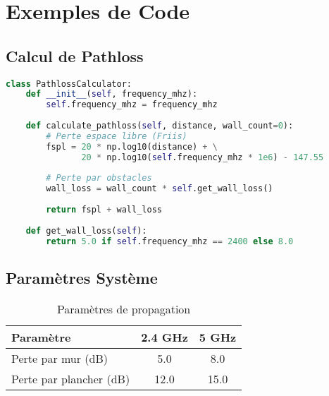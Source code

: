 \documentclass[12pt,a4paper]{article}
\begin{document}
\section{Exemples de Code}

\subsection{Calcul de Pathloss}

\begin{lstlisting}[language=Python, caption=Classe principale de calcul]
class PathlossCalculator:
    def __init__(self, frequency_mhz):
        self.frequency_mhz = frequency_mhz
        
    def calculate_pathloss(self, distance, wall_count=0):
        # Perte espace libre (Friis)
        fspl = 20 * np.log10(distance) + \
               20 * np.log10(self.frequency_mhz * 1e6) - 147.55
        
        # Perte par obstacles
        wall_loss = wall_count * self.get_wall_loss()
        
        return fspl + wall_loss
        
    def get_wall_loss(self):
        return 5.0 if self.frequency_mhz == 2400 else 8.0
\end{lstlisting}

\subsection{Paramètres Système}

\begin{table}[H]
\centering
\begin{tabular}{|l|c|c|}
\hline
\textbf{Paramètre} & \textbf{2.4 GHz} & \textbf{5 GHz} \\
\hline
Perte par mur (dB) & 5.0 & 8.0 \\
Perte par plancher (dB) & 12.0 & 15.0 \\
\hline
\end{tabular}
\caption{Paramètres de propagation}
\end{table}
\end{document}

